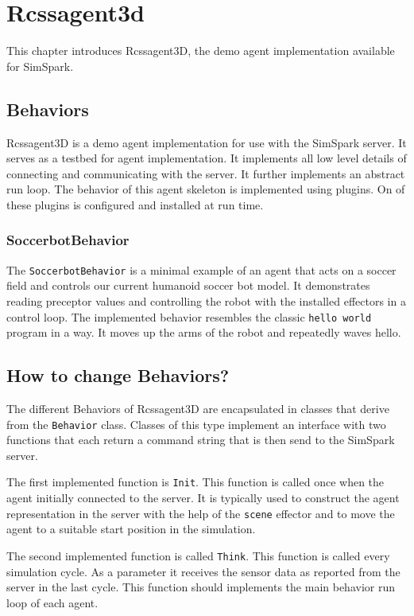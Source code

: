 \chapter{Rcssagent3d}
\label{cha:rcssagent3d}

This chapter introduces Rcssagent3D, the demo agent implementation
available for SimSpark.

\section{Behaviors}

Rcssagent3D is a demo agent implementation for use with the SimSpark
server. It serves as a testbed for agent implementation. It implements
all low level details of connecting and communicating with the
server. It further implements an abstract run loop. The behavior of
this agent skeleton is implemented using plugins. On of these plugins
is configured and installed at run time.

\subsection{SoccerbotBehavior}

The \texttt{SoccerbotBehavior} is a minimal example of an agent that
acts on a soccer field and controls our current humanoid soccer bot
model. It demonstrates reading preceptor values and controlling the
robot with the installed effectors in a control loop. The implemented
behavior resembles the classic \texttt{hello world} program in a
way. It moves up the arms of the robot and repeatedly waves hello.

\section{How to change Behaviors?}

The different Behaviors of Rcssagent3D are encapsulated in classes
that derive from the \texttt{Behavior} class. Classes of this type
implement an interface with two functions that each return a command
string that is then send to the SimSpark server.

The first implemented function is \texttt{Init}. This function is
called once when the agent initially connected to the server. It is
typically used to construct the agent representation in the server
with the help of the \texttt{scene} effector and to move the agent to
a suitable start position in the simulation.

The second implemented function is called \texttt{Think}. This
function is called every simulation cycle. As a parameter it receives
the sensor data as reported from the server in the last cycle. This
function should implements the main behavior run loop of each
agent.


